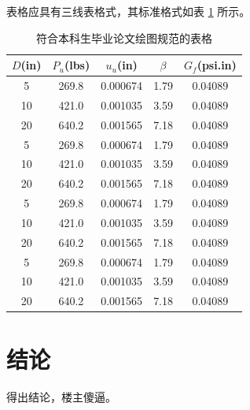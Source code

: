 表格应具有三线表格式，其标准格式如表 \ref{tab:table1} 所示。
\begin{table}[htbp]
\caption{符合本科生毕业论文绘图规范的表格}\label{tab:table1}
\vspace{0.5em}\centering\wuhao
\begin{tabular}{ccccc}
\toprule[1.5pt]
$D$(in) & $P_u$(lbs) & $u_u$(in) & $\beta$ & $G_f$(psi.in)\\
\midrule[1pt]
 5 & 269.8 & 0.000674 & 1.79 & 0.04089\\
10 & 421.0 & 0.001035 & 3.59 & 0.04089\\
20 & 640.2 & 0.001565 & 7.18 & 0.04089\\
 5 & 269.8 & 0.000674 & 1.79 & 0.04089\\
10 & 421.0 & 0.001035 & 3.59 & 0.04089\\
20 & 640.2 & 0.001565 & 7.18 & 0.04089\\
 5 & 269.8 & 0.000674 & 1.79 & 0.04089\\
10 & 421.0 & 0.001035 & 3.59 & 0.04089\\
20 & 640.2 & 0.001565 & 7.18 & 0.04089\\
 5 & 269.8 & 0.000674 & 1.79 & 0.04089\\
10 & 421.0 & 0.001035 & 3.59 & 0.04089\\
20 & 640.2 & 0.001565 & 7.18 & 0.04089\\
\bottomrule[1.5pt]
\end{tabular}
\vspace{\baselineskip}
\end{table}



\chapter*{结\quad 论}

得出结论，楼主傻逼。
